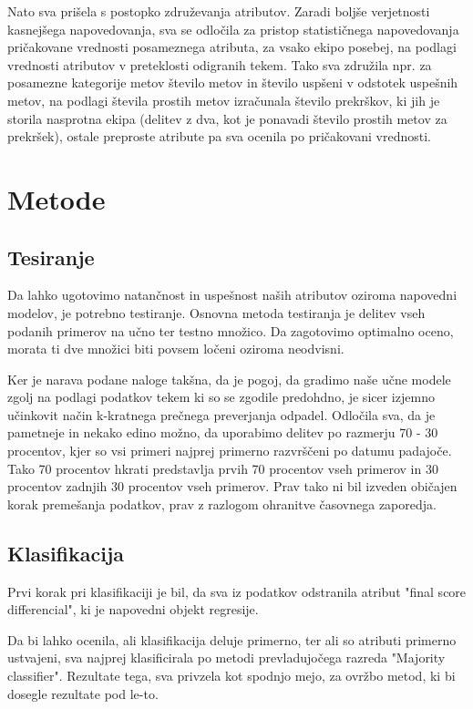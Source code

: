 \documentclass[a4paper,11pt]{article}
\begin{document}
Nato sva prišela s postopko združevanja atributov. Zaradi boljše verjetnosti 
kasnejšega napovedovanja, sva se odločila za pristop statističnega napovedovanja 
pričakovane vrednosti posameznega atributa, za vsako ekipo posebej, na podlagi 
vrednosti atributov v preteklosti odigranih tekem. Tako sva združila npr. za posamezne 
kategorije metov število metov in število uspšeni v odstotek uspešnih metov, na podlagi 
števila prostih metov izračunala število prekrškov, ki jih je storila nasprotna ekipa
 (delitev z dva, kot je ponavadi število prostih metov za prekršek), ostale preproste atribute 
pa sva ocenila po pričakovani vrednosti.

\section{Metode}

\subsection{Tesiranje}

Da lahko ugotovimo natančnost in uspešnost naših atributov oziroma 
napovedni modelov, je potrebno testiranje. Osnovna metoda testiranja 
je delitev vseh podanih primerov na učno ter testno množico. Da 
zagotovimo optimalno oceno, morata ti dve množici biti povsem ločeni 
oziroma neodvisni. 

Ker je narava podane naloge takšna, da je pogoj, da gradimo naše učne 
modele zgolj na podlagi podatkov tekem ki so se zgodile predohdno, je 
sicer izjemno učinkovit način k-kratnega prečnega preverjanja odpadel. 
Odločila sva, da je pametneje in nekako edino možno, da uporabimo delitev 
po razmerju 70 - 30 procentov, kjer so vsi primeri najprej primerno razvrščeni
 po datumu padajoče. Tako 70 procentov hkrati predstavlja prvih 70 procentov 
vseh primerov in 30 procentov zadnjih 30 procentov vseh primerov. Prav tako 
ni bil izveden običajen korak premešanja podatkov, prav z razlogom ohranitve 
časovnega zaporedja.

\subsection{Klasifikacija}

Prvi korak pri klasifikaciji je bil, da sva iz podatkov odstranila atribut 
"final score differencial", ki je napovedni objekt regresije.

Da bi lahko ocenila, ali klasifikacija deluje primerno, ter ali so atributi 
primerno ustvajeni, sva najprej klasificirala po metodi prevladujočega razreda 
"Majority classifier". Rezultate tega, sva privzela kot spodnjo mejo, za ovržbo 
metod, ki bi dosegle rezultate pod le-to.
\end{document}
